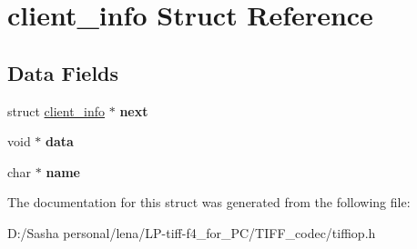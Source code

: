 \hypertarget{structclient__info}{}\section{client\+\_\+info Struct Reference}
\label{structclient__info}
\subsection*{Data Fields}
\begin{DoxyCompactItemize}
\item 
\hypertarget{structclient__info_aa8bfc454a93870ff49409127f2414cf4}{}struct \hyperlink{structclient__info}{client\+\_\+info} $\ast$ {\bfseries next}\label{structclient__info_aa8bfc454a93870ff49409127f2414cf4}

\item 
\hypertarget{structclient__info_a735984d41155bc1032e09bece8f8d66d}{}void $\ast$ {\bfseries data}\label{structclient__info_a735984d41155bc1032e09bece8f8d66d}

\item 
\hypertarget{structclient__info_a5ac083a645d964373f022d03df4849c8}{}char $\ast$ {\bfseries name}\label{structclient__info_a5ac083a645d964373f022d03df4849c8}

\end{DoxyCompactItemize}


The documentation for this struct was generated from the following file\+:\begin{DoxyCompactItemize}
\item 
D\+:/\+Sasha personal/lena/\+L\+P-\/tiff-\/f4\+\_\+for\+\_\+\+P\+C/\+T\+I\+F\+F\+\_\+codec/tiffiop.\+h\end{DoxyCompactItemize}
